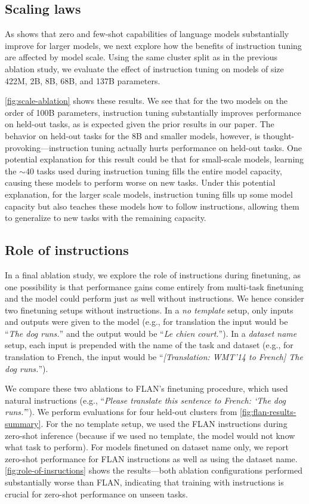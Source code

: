 \subsection{Scaling laws}\label{subsec:scaling_laws}

As \citet{brown2020language} shows that zero and few-shot capabilities of language models substantially improve for larger models, we next explore how the benefits of instruction tuning are affected by model scale. Using the same cluster split as in the previous ablation study, we evaluate the effect of instruction tuning on models of size 422M, 2B, 8B, 68B, and 137B parameters. 

\ref{fig:scale-ablation} shows these results. We see that for the two models on the order of 100B parameters, instruction tuning substantially improves performance on held-out tasks, as is expected given the prior results in our paper. The behavior on held-out tasks for the 8B and smaller models, however, is thought-provoking---instruction tuning actually hurts performance on held-out tasks. One potential explanation for this result could be that for small-scale models, learning the $\sim$40 tasks used during instruction tuning fills the entire model capacity, causing these models to perform worse on new tasks. Under this potential explanation, for the larger scale models, instruction tuning fills up some model capacity but also teaches these models how to follow instructions, allowing them to generalize to new tasks with the remaining capacity. 

\subsection{Role of instructions}\label{subsec:role-of-instructions}
In a final ablation study, we explore the role of instructions during finetuning, as one possibility is that performance gains come entirely from multi-task finetuning and the model could perform just as well without instructions. We hence consider two finetuning setups without instructions. In a \textit{no template} setup, only inputs and outputs were given to the model (e.g., for translation the input would be ``\textit{The dog runs.}'' and the output would be ``\textit{Le chien court.}''). In a \textit{dataset name} setup, each input is prepended with the name of the task and dataset (e.g., for translation to French, the input would be ``\textit{[Translation: WMT'14 to French] The dog runs.}'').

We compare these two ablations to FLAN's finetuning procedure, which used natural instructions (e.g., ``\textit{Please translate this sentence to French: `The dog runs.'}''). We perform evaluations for four held-out clusters from \ref{fig:flan-results-summary}.
For the no template setup, we used the FLAN instructions during zero-shot inference (because if we used no template, the model would not know what task to perform). For models finetuned on dataset name only, we report zero-shot performance for FLAN instructions as well as using the dataset name.
\ref{fig:role-of-insructions} shows the results---both ablation configurations performed substantially worse than FLAN, indicating that training with instructions is crucial for zero-shot performance on unseen tasks.

